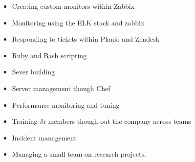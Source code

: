 \documentclass[]{friggeri-cv-a4}
\begin{document}
\begin{entrylist}
{\begin{itemize}
      \item Creating custom monitors within Zabbix
      \item Monitoring using the ELK stack and zabbix
      \item Responding to tickets within Planio and Zendesk
      \item Ruby and Bash scripting
      \item Sever building
      \item Server management though Chef
      \item Performance monitoring and tuning
      \item Training Jr members though out the company across teams
      \item Incident management
      \item Managing a small team on research projects.
    \end{itemize}
    }
 \end{entrylist}
\end{document}

